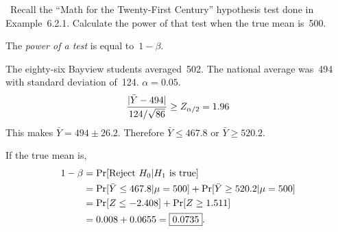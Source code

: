 \begin{problem}
  ~Recall the ``Math for the Twenty-First Century'' hypothesis test done in Example~6.2.1. Calculate the power of that test when the true mean is~500.
\end{problem}

The \textit{power of a test} is equal to~${1-\beta}$.

\noindent
The eighty-six Bayview students averaged~502.  The national average was~494 with standard deviation of~124. ${\alpha = 0.05}$.
\begin{equation*}
  \frac{\lvert\bar{Y} - 494\rvert}{124 / \sqrt{86}} \geq Z_{\alpha/2} = 1.96
\end{equation*}
\noindent
This makes ${\bar{Y} = 494 \pm 26.2}$.  Therefore ${\bar{Y} \leq 467.8}$ or ${\bar{Y} \geq 520.2}$.

\noindent
If the true mean is,
\begin{align*}
  1 - \beta &= \Pr\lbrack\text{Reject } H_0 \vert H_1 \text{ is true}\rbrack \\
            &= \Pr\lbrack\bar{Y} \leq 467.8 \vert \mu = 500\rbrack + \Pr\lbrack\bar{Y} \geq 520.2 \vert \mu = 500\rbrack\\
            &= \Pr\lbrack Z \leq -2.408\rbrack + \Pr\lbrack Z \geq 1.511\rbrack \\
            &= 0.008 + 0.0655 = \boxed{0.0735}.
\end{align*}
